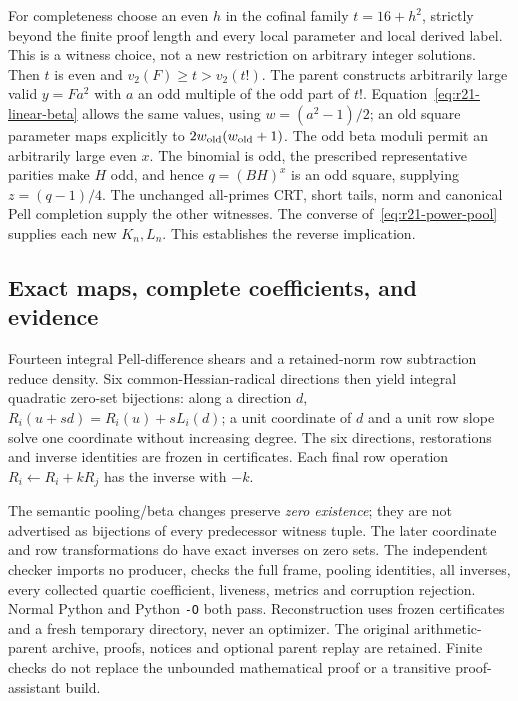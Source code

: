 For completeness choose an even $h$ in the cofinal family $t=16+h^2$,
strictly beyond the finite proof length and every local parameter and
local derived label. This is a witness choice, not a new restriction on
arbitrary integer solutions. Then $t$ is even and $v_2(F)\ge t>v_2(t!)$.
The parent constructs arbitrarily large valid $y=Fa^2$ with $a$ an odd
multiple of the odd part of $t!$. Equation~\eqref{eq:r21-linear-beta}
allows the same values, using $w=(a^2-1)/2$; an old square parameter maps
explicitly to $2w_{\rm old}(w_{\rm old}+1)$.
The odd beta moduli permit an arbitrarily large even $x$. The binomial is
odd, the prescribed representative parities make $H$ odd, and hence
$q=(BH)^x$ is an odd square, supplying $z=(q-1)/4$. The unchanged all-primes
CRT, short tails, norm and canonical Pell completion supply the other
witnesses. The converse of~\eqref{eq:r21-power-pool} supplies each new
$K_n,L_n$. This establishes the reverse implication.

\subsection{Exact maps, complete coefficients, and evidence}
Fourteen integral Pell-difference shears and a retained-norm row subtraction
reduce density. Six common-Hessian-radical directions then yield integral
quadratic zero-set bijections: along a direction $d$,
$R_i(u+sd)=R_i(u)+sL_i(d)$; a unit coordinate of $d$ and a unit row slope
solve one coordinate without increasing degree. The six directions,
restorations and inverse identities are frozen in certificates. Each final
row operation $R_i\leftarrow R_i+kR_j$ has the inverse with $-k$.

The semantic pooling/beta changes preserve \emph{zero existence}; they are
not advertised as bijections of every predecessor witness tuple. The later
coordinate and row transformations do have exact inverses on zero sets.
The independent checker imports no producer, checks the full frame,
pooling identities, all inverses, every collected quartic coefficient,
liveness, metrics and corruption rejection. Normal Python and Python
\texttt{-O} both pass. Reconstruction uses frozen certificates and a fresh
temporary directory, never an optimizer. The original arithmetic-parent
archive, proofs, notices and optional parent replay are retained.
Finite checks do not replace the unbounded mathematical proof or a
transitive proof-assistant build.
